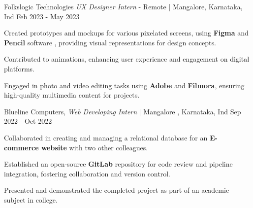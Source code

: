 \begin{cventries2}
  \cventrynew
    {Folkslogic Technologies \textnormal{\textit{UX Designer Intern} - Remote | Mangalore, Karnataka, Ind}} %
    {Feb 2023 - May 2023} %
    {
      \begin{cvitems} %
        \item {Created prototypes and mockups for various pixelated screens, using {\bf Figma} and {\bf Pencil} software , providing visual representations for design concepts.}
      \item {Contributed to animations, enhancing user experience and engagement on digital platforms.}
      \item {Engaged in photo and video editing tasks using {\bf Adobe} and {\bf Filmora}, ensuring high-quality multimedia content for projects.}
      \end{cvitems}
      }


  \cventrynew
    {Blueline Computers, \textnormal{\textit{Web Developing Intern} | Mangalore , Karnataka, Ind}} %
    {Sep 2022 - Oct 2022} %
    {
      \begin{cvitems} %
         \item {Collaborated in creating and managing a relational database for an {\bf E-commerce website} with two other colleagues.}
  \item {Established an open-source {\bf GitLab} repository for code review and pipeline integration, fostering collaboration and version control.}
  \item {Presented and demonstrated the completed project as part of an academic subject in college.}
      \end{cvitems}
    }

\end{cventries2}
